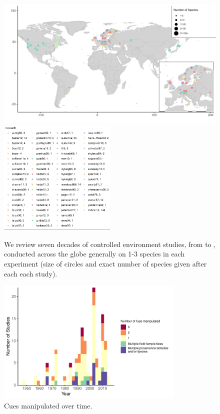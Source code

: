 \documentclass[11pt]{article}
\begin{document}
\begin{figure}[t!]
\centering
\includegraphics[width=1\textwidth]{..//..//analyses/limitingcues/figures/maps/map_studyspp.pdf}
\includegraphics[width=0.5\textwidth]{..//..//analyses/limitingcues/figures/maps/map_studyspp_legend.pdf}
\caption{We review seven decades of controlled environment studies, from \citet{Lamb:1948aa} to \citet{zohner2016}, conducted across the globe generally on 1-3 species in each experiment (size of circles and exact number of species given after each each study). }
  \label{fig:datamap} %
\end{figure}


\begin{figure}[t!]
\centering
\includegraphics[width=0.8\textwidth]{..//..//analyses/limitingcues/figures/studyyearcues.pdf}
\caption{Cues manipulated over time.}
  \label{fig:ts}
\end{figure}
\end{document}
